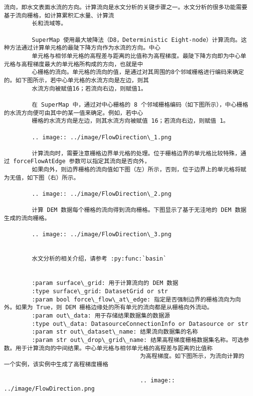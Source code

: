 \documentclass[11pt]{article}
\begin{document}
\begin{Verbatim}[commandchars=\\\{\}]
        流向，即水文表面水流的方向。计算流向是水文分析的关键步骤之一。水文分析的很多功能需要基于流向栅格，如计算累积汇水量、计算流
        长和流域等。
        
        SuperMap 使用最大坡降法（D8，Deterministic Eight-node）计算流向。这种方法通过计算单元格的最陡下降方向作为水流的方向。中心
        单元格与相邻单元格的高程差与距离的比值称为高程梯度。最陡下降方向即为中心单元格与高程梯度最大的单元格所构成的方向，也就是中
        心栅格的流向。单元格的流向的值，是通过对其周围的8个邻域栅格进行编码来确定的。如下图所示，若中心单元格的水流方向是左边，则其
        水流方向被赋值16；若流向右边，则赋值1。
        
        在 SuperMap 中，通过对中心栅格的 8 个邻域栅格编码（如下图所示），中心栅格的水流方向便可由其中的某一值来确定。例如，若中心
        栅格的水流方向是左边，则其水流方向被赋值 16；若流向右边，则赋值 1。
        
        .. image:: ../image/FlowDirection\_1.png
        
        计算流向时，需要注意栅格边界单元格的处理。位于栅格边界的单元格比较特殊，通过 forceFlowAtEdge 参数可以指定其流向是否向外，
        如果向外，则边界栅格的流向值如下图（左）所示，否则，位于边界上的单元格将赋为无值，如下图（右）所示。
        
        .. image:: ../image/FlowDirection\_2.png
        
        计算 DEM 数据每个栅格的流向得到流向栅格。下图显示了基于无洼地的 DEM 数据生成的流向栅格。
        
        .. image:: ../image/FlowDirection\_3.png
        
        
        水文分析的相关介绍，请参考 :py:func:`basin`
        
        
        :param surface\_grid: 用于计算流向的 DEM 数据
        :type surface\_grid: DatasetGrid or str
        :param bool force\_flow\_at\_edge: 指定是否强制边界的栅格流向为向外。如果为 True，则 DEM 栅格边缘处的所有单元的流向都是从栅格向外流动。
        :param out\_data: 用于存储结果数据集的数据源
        :type out\_data: DatasourceConnectionInfo or Datasource or str
        :param str out\_dataset\_name: 结果流向数据集的名称
        :param str out\_drop\_grid\_name: 结果高程梯度栅格数据集名称。可选参数。用于计算流向的中间结果。中心单元格与相邻单元格的高程差与距离的比值称
                                       为高程梯度。如下图所示，为流向计算的一个实例，该实例中生成了高程梯度栅格
        
                                       .. image:: ../image/FlowDirection.png
        

\end{Verbatim}
\end{document}
